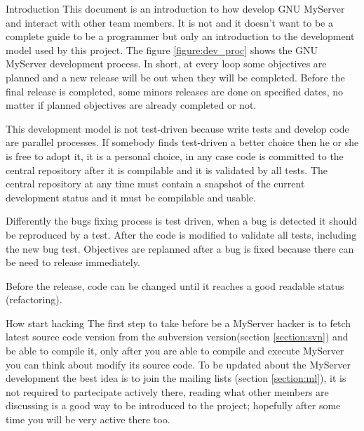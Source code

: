\documentclass[12pt]{article}
\begin{document}
\begin{section}{Introduction}
This document is an introduction to how develop GNU MyServer and
interact with other team members.
It is not and it doesn't want to be a complete guide to be a
programmer but only an introduction to the development model used by
this project.
The figure \ref{figure:dev_proc} shows the GNU MyServer development
process.
In short, at every loop some objectives are planned and a new release
will be out when they will be completed.
Before the final release is completed, some minors releases are done
on specified dates, no matter if planned objectives are already
completed or not.

This development model is not test-driven because write tests and
develop code are parallel processes.
If somebody finds test-driven a better choice then he or she is free
to adopt it, it is a personal choice, in any case code is committed
to the central repository after it is compilable and it is validated
by all tests.
The central repository at any time must contain a snapshot of the
current development status and it must be compilable and usable.

Differently the bugs fixing process is test driven, when a bug is
detected it should be reproduced by a test.  After the code is
modified to validate all tests, including the new bug test.
Objectives are replanned after a bug is fixed because there can be
need to release immediately.

Before the release, code can be changed until it reaches a good
readable status (refactoring).
\end{section}

\begin{section}{How start hacking}
The first step to take before be a MyServer hacker is to fetch latest
source code version from the subversion version(section
\ref{section:svn}) and be able to compile it, only after you are able
to compile and execute MyServer you can think about modify its source
code.
To be updated about the MyServer development the best idea is to join
the mailing lists (section \ref{section:ml}), it is not required to
partecipate actively there, reading what other members are discussing
is a good way to be introduced to the project; hopefully after some
time you will be very active there too.
\end{section}
\end{document}
